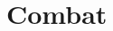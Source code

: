 \documentclass[titlepage,a4paper,openany]{book}
\begin{document}
\racechart

\chapter{Combat}

\begin{multicols}{2}

\initiativechart

\columnbreak

\armourchart

\moralechart

\end{multicols}

\pagebreak

\weaponschart

\pagebreak

\printglossary

\printindex


\end{document}
